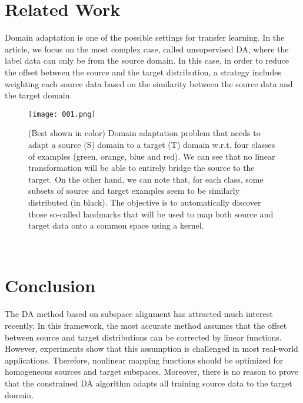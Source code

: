 \documentclass[30pt,twocolumn,letterpaper]{article}
\begin{document}
\section{Related Work}
Domain adaptation is one of the possible settings for transfer learning. In the article, we focus on the most complex case, called unsupervised DA, where the label data can only be from the source domain. In this case, in order to reduce the offset between the source and the target distribution, a strategy includes weighting each source data based on the similarity between the source data and the target domain\cite{Khuller1996Landmarks}.
\begin{figure}[htbp]
\small
\centering
\texttt{[image: 001.png]}
\caption{(Best shown in color) Domain adaptation problem that
needs to adapt a source (S) domain to a target (T) domain w.r.t.
four classes of examples (green, orange, blue and red). We can
see that no linear transformation will be able to entirely bridge
the source to the target. On the other hand, we can note that, for
each class, some subsets of source and target examples seem to be
similarly distributed (in black). The objective is to automatically
discover those so-called landmarks that will be used to map both
source and target data onto a common space using a kernel.
}
\label{fig:lable}
\end{figure}\\
\section{Conclusion}
The DA method based on subspace alignment has attracted much interest recently. In this framework, the most accurate method assumes that the offset between source and target distributions can be corrected by linear functions\cite{Yu2012Image}. However, experiments show that this assumption is challenged in most real-world applications. Therefore, nonlinear mapping functions should be optimized for homogeneous sources and target subspaces. Moreover, there is no reason to prove that the constrained DA algorithm adapts all training source data to the target domain\cite{Fabbri2016Multiview}.\\
{\small


}
\end{document}
